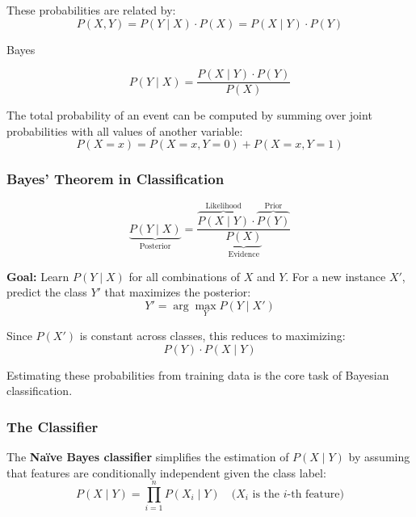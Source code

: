 These probabilities are related by:
\begin{equation}
P(X, Y) = P(Y \mid X) \cdot P(X) = P(X \mid Y) \cdot P(Y)
\end{equation}
\begin{theorem}{Bayes}

\begin{equation}
P(Y \mid X) = \frac{P(X \mid Y) \cdot P(Y)}{P(X)}
\end{equation}
    
\end{theorem}

\begin{theorem}
The total probability of an event can be computed by summing over joint probabilities with all values of another variable:
\begin{equation}
P(X = x) = P(X = x, Y = 0) + P(X = x, Y = 1)
\end{equation}
\end{theorem}
\subsubsection{Bayes' Theorem in Classification}

\begin{equation}
\underbrace{P(Y \mid X)}_{\text{Posterior}} = \frac{\overbrace{P(X \mid Y)}^{\text{Likelihood}} \cdot \overbrace{P(Y)}^{\text{Prior}}}{\underbrace{P(X)}_{\text{Evidence}}}
\end{equation}

\textbf{Goal:} Learn $P(Y \mid X)$ for all combinations of $X$ and $Y$. For a new instance $X'$, predict the class $Y'$ that maximizes the posterior:
\[
Y' = \arg\max_Y P(Y \mid X')
\]

Since $P(X')$ is constant across classes, this reduces to maximizing:
\[
P(Y) \cdot P(X \mid Y)
\]

Estimating these probabilities from training data is the core task of Bayesian classification.

\subsubsection{The Classifier}

The \textbf{Na\"ive Bayes classifier} simplifies the estimation of $P(X \mid Y)$ by assuming that features are conditionally independent given the class label:
\begin{equation}
P(X \mid Y) = \prod_{i=1}^{n} P(X_i \mid Y) \quad \text{($X_i$ is the $i$-th feature)}
\end{equation}

